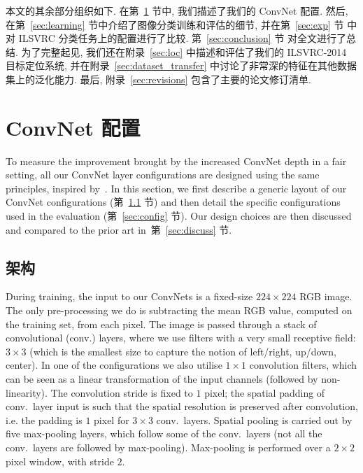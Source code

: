 \documentclass{article} %
\makeatletter
\newcommand{\sref}[1]{第~\ref{#1} 节}
\newcommand{\apref}[1]{附录~\ref{#1}}
\newcommand*{\ie}{i.e.\@\xspace}
\makeatother
\begin{document}
本文的其余部分组织如下. 在\sref{sec:arch_config}中, 我们描述了我们的 ConvNet 配置. 然后, 在\sref{sec:learning}中介绍了图像分类训练和评估的细节, 并在\sref{sec:exp} 中对 ILSVRC 分类任务上的配置进行了比较. \sref{sec:conclusion} 对全文进行了总结.
为了完整起见, 我们还在\apref{sec:loc} 中描述和评估了我们的 ILSVRC-2014 目标定位系统, 并在\apref{sec:dataset_transfer} 中讨论了非常深的特征在其他数据集上的泛化能力. 最后, \apref{sec:revisions} 包含了主要的论文修订清单.

\section{ConvNet 配置}
\label{sec:arch_config}
To measure the improvement brought by the increased ConvNet depth in a fair setting, all our \mbox{ConvNet} layer configurations are designed using the same principles, inspired by~\citet{Ciresan11,Krizhevsky12}.
In this section, we first describe a generic layout of our \mbox{ConvNet} configurations (\sref{sec:arch}) and then detail the specific configurations used in the evaluation (\sref{sec:config}).
Our design choices are then discussed and compared to the prior art in~\sref{sec:discuss}.

\subsection{架构}
\label{sec:arch}
During training, the input to our ConvNets is a fixed-size $224\times224$ RGB image. The only pre-processing we do is subtracting the mean RGB value, computed on the training set, from each pixel.
The image is passed through a stack of convolutional (conv.) layers, where we use filters with a very small receptive field: $3\times 3$ (which is the smallest size to capture the notion of 
left/right, up/down, center).
In one of the configurations we also utilise $1\times 1$ convolution filters, which can be seen as a linear transformation of the input channels (followed by non-linearity).
The convolution stride is fixed to $1$ pixel; the spatial padding of conv.\ layer input is such that the spatial resolution is preserved after convolution, \ie
the padding is $1$ pixel for $3\times3$ conv.\ layers.
Spatial pooling is carried out by five max-pooling layers, which follow some of the conv.\ layers (not all the conv.\ layers are followed by max-pooling).
Max-pooling is performed over a $2\times 2$ pixel window, with stride $2$.
\end{document}
